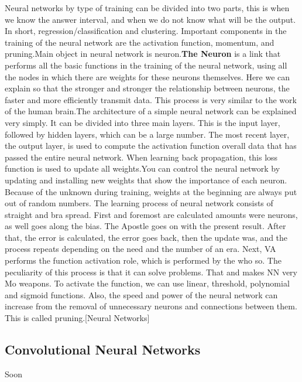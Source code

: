 Neural networks by type of training can be divided into two parts, this is when we know the answer interval, and when we do not know what will be the output. In short, regression/classification and clustering. Important components in the training of the neural network are the activation function, momentum, and pruning.Main object in neural network is neuron.\textbf{The Neuron} is a link that performs all the basic functions in the training of the neural network, using all the nodes in which there are weights for these neurons themselves. Here we can explain so that the stronger and stronger the relationship between neurons, the faster and more efficiently transmit data. This process is very similar to the work of the human brain.The architecture of a simple neural network can be explained very simply. It can be divided into three main layers. This is the input layer, followed by hidden layers, which can be a large number. The most recent layer, the output layer, is used to compute the activation function overall data that has passed the entire neural network. When learning back propagation, this loss function is used to update all weights.You can control the neural network by updating and installing new weights that show the importance of each neuron. Because of the unknown during training, weights at the beginning are always put out of random numbers. The learning process of neural network consists of straight and bra spread. First and foremost are calculated amounts were neurons, as well goes along the bias. The Apostle goes on with the present result. After that, the error is calculated, the error goes back, then the update was, and the process repeats depending on the need and the number of an era. Next, VA performs the function activation role, which is performed by the who so. The peculiarity of this process is that it can solve problems. That and makes NN very Mo weapons. To activate the function, we can use linear, threshold, polynomial and sigmoid functions. Also, the speed and power of the neural network can increase from the removal of unnecessary neurons and connections between them. This is called pruning.[Neural Networks]
\vspace{-0.3cm}

\subsection{Convolutional Neural Networks}\label{sec:3.8.1}
\vspace{-0.5cm}
\noindent Soon


